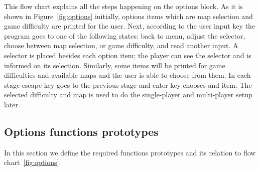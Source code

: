 This flow chart explains all the steps happening on the options block. 
As it is shown in Figure~\ref{fig:options} initially, options items which are map selection and game difficulty are printed for the user. 
Next, according to the user input key the program goes to one of the following states: 
back to menu, adjust the selector, choose between map selection, or game difficulty, and read another input. 
A selector is placed besides each option item; the player can see the selector and is informed on its selection.
Similarly, some items will be printed for game difficulties and available maps and the user is able to choose from them.
In each stage escape key goes to the previous stage and enter key chooses and item. 
The selected difficulty and map is used to do the single-player and multi-player setup later.

\subsection{Options functions prototypes}

In this section we define the required functions prototypes and its relation to flow chart~\ref{fig:options}.

